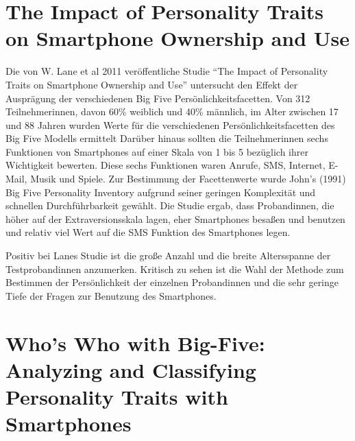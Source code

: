 \section*{The Impact of Personality Traits on Smartphone Ownership and Use}

Die von W. Lane et al 2011 veröffentliche Studie "`The Impact of Personality Traits on Smartphone Ownership and Use"' untersucht den Effekt der Ausprägung der verschiedenen Big Five Persönlichkeitsfacetten.
Von 312 Teilnehmerinnen, davon 60\% weiblich und 40\% männlich, im Alter zwischen 17 und 88 Jahren wurden Werte für die verschiedenen Persönlichkeitsfacetten des Big Five Modells ermittelt
Darüber hinaus sollten die Teilnehmerinnen sechs Funktionen von Smartphones auf einer Skala von 1 bis 5 bezüglich ihrer Wichtigkeit bewerten.
Diese sechs Funktionen waren Anrufe, SMS, Internet, E-Mail, Musik und Spiele.
Zur Bestimmung der Facettenwerte wurde John's (1991) Big Five Personality Inventory aufgrund seiner geringen Komplexität und schnellen Durchführbarkeit gewählt.
Die Studie ergab, dass Probandinnen, die höher auf der Extraversionsskala lagen, eher Smartphones besaßen und benutzen und relativ viel Wert auf die SMS Funktion des Smartphones legen. 
\par
Positiv bei Lanes Studie ist die große Anzahl und die breite Altersspanne der Testprobandinnen anzumerken.
Kritisch zu sehen ist die Wahl der Methode zum Bestimmen der Persönlichkeit der einzelnen Probandinnen und die sehr geringe Tiefe der Fragen zur Benutzung des Smartphones.


\section*{Who’s Who with Big-Five: Analyzing and Classifying Personality Traits with Smartphones}

